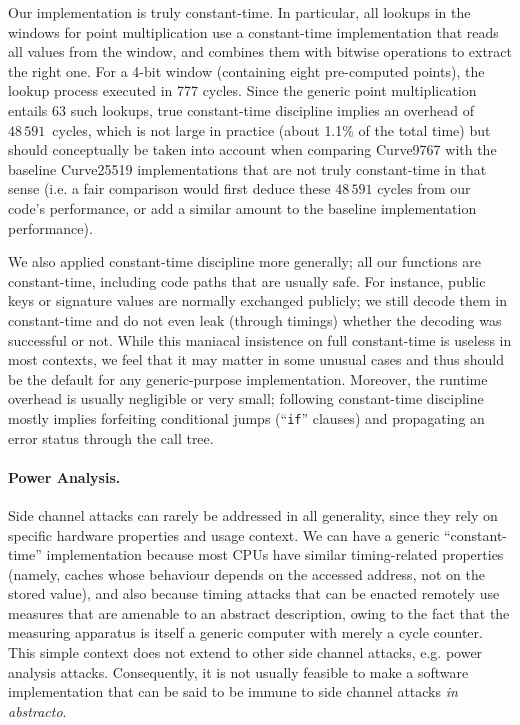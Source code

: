 \documentclass{llncs}
\begin{document}
Our implementation is truly constant-time. In particular, all lookups in
the windows for point multiplication use a constant-time implementation
that reads all values from the window, and combines them with bitwise
operations to extract the right one. For a 4-bit window (containing
eight pre-computed points), the lookup process executed in 777 cycles.
Since the generic point multiplication entails 63 such lookups, true
constant-time discipline implies an overhead of $48\,591$~cycles, which
is not large in practice (about 1.1\% of the total time) but should
conceptually be taken into account when comparing Curve9767 with the
baseline Curve25519 implementations that are not truly constant-time in
that sense (i.e. a fair comparison would first deduce these $48\,591$
cycles from our code's performance, or add a similar amount to the
baseline implementation performance).

We also applied constant-time discipline more generally; all our
functions are constant-time, including code paths that are usually safe.
For instance, public keys or signature values are normally exchanged
publicly; we still decode them in constant-time and do not even leak
(through timings) whether the decoding was successful or not. While this
maniacal insistence on full constant-time is useless in most contexts,
we feel that it may matter in some unusual cases and thus should be the
default for any generic-purpose implementation. Moreover, the runtime
overhead is usually negligible or very small; following constant-time
discipline mostly implies forfeiting conditional jumps (``\verb+if+''
clauses) and propagating an error status through the call tree.

\paragraph{Power Analysis.}

Side channel attacks can rarely be addressed in all generality, since
they rely on specific hardware properties and usage context. We can have
a generic ``constant-time'' implementation because most CPUs have
similar timing-related properties (namely, caches whose behaviour
depends on the accessed address, not on the stored value), and also
because timing attacks that can be enacted remotely use measures that
are amenable to an abstract description, owing to the fact that the
measuring apparatus is itself a generic computer with merely a cycle
counter. This simple context does not extend to other side channel
attacks, e.g. power analysis attacks. Consequently, it is not usually
feasible to make a software implementation that can be said to be immune
to side channel attacks \emph{in abstracto}.
\end{document}
